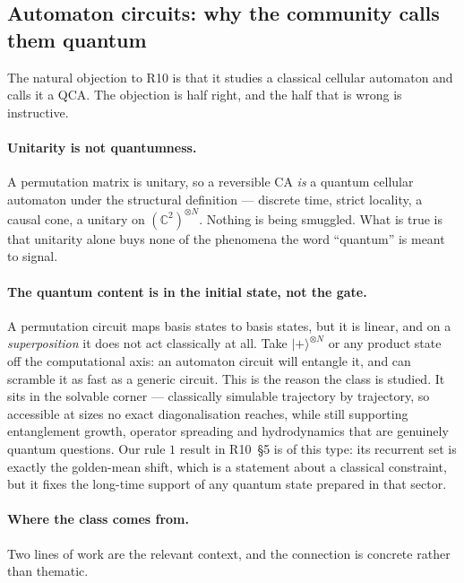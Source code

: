 \documentclass[11pt]{article}
\providecommand{\ket}[1]{|#1\rangle}
\theoremstyle{plain}
\theoremstyle{remark}
\begin{document}
\subsection{Automaton circuits: why the community calls them quantum}
\label{sec:automaton}

The natural objection to R10 is that it studies a classical cellular automaton and
calls it a QCA. The objection is half right, and the half that is wrong is
instructive.

\paragraph{Unitarity is not quantumness.} A permutation matrix is unitary, so a
reversible CA \emph{is} a quantum cellular automaton under the structural
definition --- discrete time, strict locality, a causal cone, a unitary on
$(\mathbb{C}^2)^{\otimes N}$. Nothing is being smuggled. What is true is that
unitarity alone buys none of the phenomena the word ``quantum'' is meant to
signal.

\paragraph{The quantum content is in the initial state, not the gate.} A
permutation circuit maps basis states to basis states, but it is linear, and on a
\emph{superposition} it does not act classically at all. Take $\ket{+}^{\otimes N}$
or any product state off the computational axis: an automaton circuit will
entangle it, and can scramble it as fast as a generic circuit. This is the reason
the class is studied. It sits in the solvable corner --- classically simulable
trajectory by trajectory, so accessible at sizes no exact diagonalisation reaches,
while still supporting entanglement growth, operator spreading and hydrodynamics
that are genuinely quantum questions. Our rule $1$ result in R10~\S5 is of this
type: its recurrent set is exactly the golden-mean shift, which is a statement
about a classical constraint, but it fixes the long-time support of any quantum
state prepared in that sector.

\paragraph{Where the class comes from.} Two lines of work are the relevant
context, and the connection is concrete rather than thematic.
\end{document}
